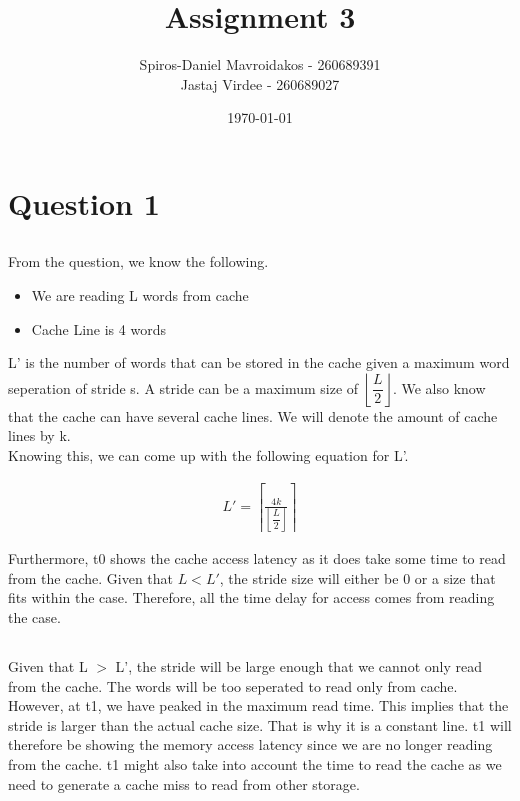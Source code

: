 \documentclass[11pt]{article}
\title{Assignment 3}
\author{Spiros-Daniel Mavroidakos - 260689391\\Jastaj Virdee - 260689027}
\date{\today}
\begin{document}
\maketitle
{}
\newpage
\tableofcontents
\newpage
{}

\section{Question 1}

\subsection{}
From the question, we know the following.
\begin{itemize}
	\item We are reading L words from cache
	\item Cache Line is 4 words
\end{itemize}
L' is the number of words that can be stored in the cache given a maximum word seperation of stride s. A stride can be a maximum size of 
$\left\lfloor\dfrac{L}{2}\right\rfloor$. We also know that the cache can have several cache lines. We will denote the amount of cache lines 
by k. \\
Knowing this, we can come up with the following equation for L'.

\begin{equation}
	\begin{split}
		L' = \left\lceil\frac{4k}{\left\lfloor\dfrac{L}{2}\right\rfloor}\right\rceil
	\end{split}
\end{equation}

Furthermore, t0 shows the cache access latency as it does take some time to read from the cache. Given that $L < L'$, the stride size will 
either be 0 or a size that fits within the case. Therefore, all the time delay for access comes from reading the case.

\subsection{}
Given that L $>$ L', the stride will be large enough that we cannot only read from the cache. The words will be too seperated to read only 
from cache. However, at t1, we have peaked in the maximum read time. This implies that the stride is larger than the actual cache size. 
That is why it is a constant line. t1 will therefore be showing the memory access latency since we are no longer reading from the cache. 
t1 might also take into account the time to read the cache as we need to generate a cache miss to read from other storage.
\end{document}
